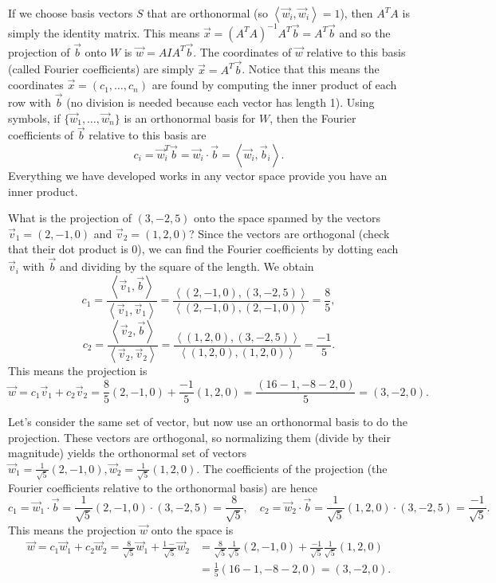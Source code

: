 If we choose basis vectors $S$ that are orthonormal (so $\left<\vec w_i,\vec w_i\right>=1$), then $A^TA$ is simply the identity matrix. This means $\vec x = (A^TA)^{-1}A^T \vec b = A^T\vec b$ and so the projection of $\vec b$ onto $W$ is $\vec w = AIA^T\vec b$.  The coordinates of $\vec w$ relative to this basis (called Fourier coefficients) are simply $\vec x = A^T \vec b$. Notice that this means the coordinates $\vec x = (c_1, \ldots, c_n)$ are found by computing the inner product of each row with $\vec b$ (no division is needed because each vector has length 1). Using symbols, if $\{\vec w_1,\ldots, \vec w_n\}$ is an orthonormal basis for $W$, then the Fourier coefficients of $\vec b$ relative to this basis are $$c_i = \vec w_i^T\vec b = \vec w_i\cdot \vec b = \left<\vec w_i,\vec b_i\right>.$$
Everything we have developed works in any vector space provide you have an inner product.

\begin{example}
What is the projection of $(3,-2,5)$ onto the space spanned by the vectors $\vec v_1=(2,-1,0)$ and $\vec v_2 = (1,2,0)$? 
Since the vectors are orthogonal (check that their dot product is 0), we can find the Fourier coefficients by dotting each $\vec v_i$ with $\vec b$ and dividing by the square of the length.  We obtain 
$$c_1 =  \frac{\left<\vec v_1, \vec b\right>}{\left<\vec v_1, \vec v_1\right>}
= \frac{\left<(2,-1,0), (3,-2,5)\right>}{\left<(2,-1,0), (2,-1,0)\right>} =  \frac{8}{5},$$
$$ c_2 =  \frac{\left<\vec v_2, \vec b\right>}{\left<\vec v_2, \vec v_2\right>}
= \frac{\left<(1,2,0), (3,-2,5)\right>}{\left<(1,2,0), (1,2,0)\right>} =  \frac{-1}{5}.$$
This means the projection is $$\vec w = c_1\vec v_1+c_2\vec v_2 = \frac{8}{5}(2,-1,0) + \frac{-1}{5}(1,2,0) = \frac{(16-1,-8-2,0)}{5} = (3,-2,0).$$

Let's consider the same set of vector, but now use an orthonormal basis to do the projection. These vectors are orthogonal, so normalizing them (divide by their magnitude) yields the orthonormal set of vectors $\vec w_1 = \frac{1}{\sqrt{5}}(2,-1,0), \vec w_2=\frac{1}{\sqrt{5}}(1,2,0)$.  The coefficients of the projection (the Fourier coefficients relative to the orthonormal basis) are hence 
$$c_1 = \vec w_1\cdot \vec b = \frac{1}{\sqrt{5}}(2,-1,0)\cdot (3,-2,5) = \frac{8}{\sqrt{5}}, \quad c_2 =  \vec w_2\cdot \vec b = \frac{1}{\sqrt{5}}(1,2,0)\cdot (3,-2,5) = \frac{-1}{\sqrt{5}}.$$ This means the projection $\vec w$ onto the space is 
\begin{align*}
\vec w = c_1 \vec w_1 + c_2\vec w_2 
= \frac{8}{\sqrt{5}} \vec w_1 + \frac{1-}{\sqrt{5}}\vec w_2 
&= \frac{8}{\sqrt{5}} \frac{1}{\sqrt{5}}(2,-1,0) + \frac{-1}{\sqrt{5}}\frac{1}{\sqrt{5}}(1,2,0) \\
&= \frac{1}{5}(16-1,-8-2,0) = (3,-2,0).
\end{align*}
\end{example}

